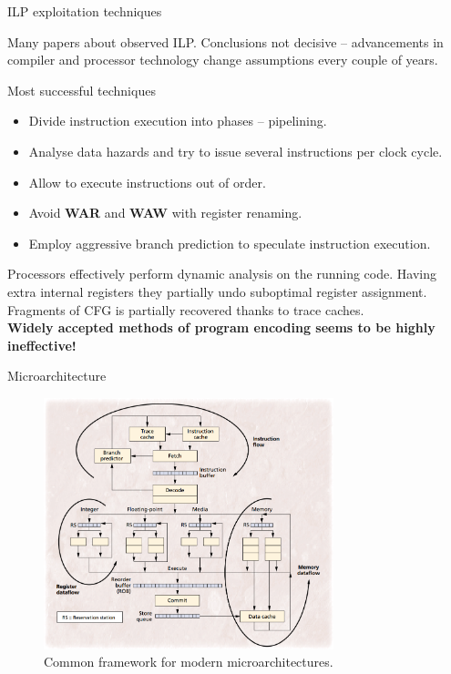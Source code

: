 \documentclass[8pt]{beamer}
\begin{document}
\begin{frame}{ILP exploitation techniques}
  \begin{alertblock}{}
    Many papers about observed ILP. Conclusions not decisive -- advancements in
    compiler and processor technology change assumptions every couple of years.
  \end{alertblock}

  \begin{block}{Most successful techniques}
    \begin{itemize}
      \item Divide instruction execution into phases -- pipelining.
      \item Analyse data hazards and try to issue several instructions per
        clock cycle.
      \item Allow to execute instructions out of order.
      \item Avoid \textbf{WAR} and \textbf{WAW} with register renaming.
      \item Employ aggressive branch prediction to speculate instruction execution.
    \end{itemize}
  \end{block}

  \begin{alertblock}{}
    Processors effectively perform dynamic analysis on the running code. Having
    extra internal registers they partially undo suboptimal register assignment.
    Fragments of CFG is partially recovered thanks to trace caches.\\
    \vspace{1.0em}
    \textbf{Widely accepted methods of program encoding seems to be highly
      ineffective!}
  \end{alertblock}
\end{frame}

\begin{frame}{Microarchitecture}
  \begin{figure}
    \centering
    \includegraphics[width=0.75\textwidth]{microarchitecture.png}
    \caption{Common framework for modern microarchitectures.}
  \end{figure}
\end{frame}
\end{document}
